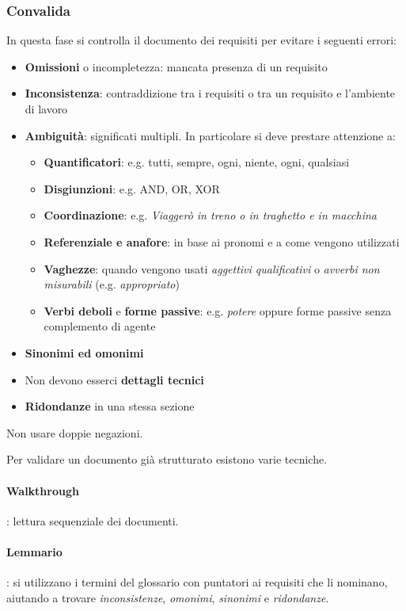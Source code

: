 \subsubsection{Convalida}
In questa fase si controlla il documento dei requisiti per evitare i seguenti errori:
\begin{itemize}
	\item \textbf{Omissioni} o incompletezza: mancata presenza di un requisito
	\item \textbf{Inconsistenza}: contraddizione tra i requisiti o tra un requisito e l'ambiente di lavoro
	\item \textbf{Ambiguità}: significati multipli. In particolare si deve prestare attenzione a:
	\begin{itemize}
		\item \textbf{Quantificatori}: e.g. tutti, sempre, ogni, niente, ogni, qualsiasi
		\item \textbf{Disgiunzioni}: e.g. AND, OR, XOR
		\item \textbf{Coordinazione}: e.g. \textit{Viaggerò in treno o in traghetto e in macchina}
		\item \textbf{Referenziale e anafore}: in base ai pronomi e a come vengono utilizzati
		\item \textbf{Vaghezze}: quando vengono usati \textit{aggettivi qualificativi} o \textit{avverbi non misurabili} (e.g. \textit{appropriato})
		\item \textbf{Verbi deboli} e \textbf{forme passive}: e.g. \textit{potere} oppure forme passive senza complemento di agente
	\end{itemize}
	\item \textbf{Sinonimi ed omonimi}
	\item Non devono esserci \textbf{dettagli tecnici}
	\item \textbf{Ridondanze} in una stessa sezione
\end{itemize}

\begin{note}
	Non usare doppie negazioni.
\end{note}

\noindent Per validare un documento già strutturato esistono varie tecniche.
\paragraph{Walkthrough}: lettura sequenziale dei documenti.
\paragraph{Lemmario}: si utilizzano i termini del glossario con puntatori ai requisiti che li nominano, aiutando a trovare \textit{inconsistenze}, \textit{omonimi}, \textit{sinonimi} e \textit{ridondanze}.
